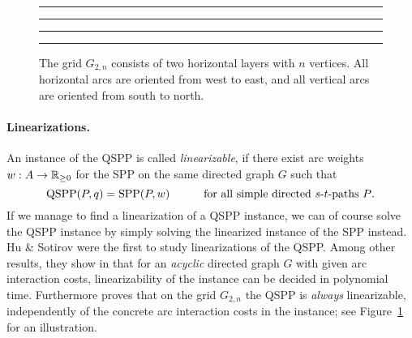 \begin{figure}[b]
\hrule\hrule
\medskip
\bigskip
\begin{center}
\end{center}
\caption{The grid $G_{2,n}$ consists of two horizontal layers with $n$ vertices.
All horizontal arcs are oriented from west to east, and all vertical arcs are oriented from south to north.}
\label{fig:grid}
\bigskip
\hrule\hrule
\end{figure}

\paragraph{Linearizations.}
An instance of the QSPP is called \emph{linearizable}, if there exist arc weights $w:A\to{\mathbb{R}_{\ge0}}$
for the SPP on the same directed graph $G$ such that
\begin{equation}
\label{eq:linearizable}
\text{QSPP}(P,q) = \text{SPP}(P,w) \text{\qquad\quad for all simple directed $s$-$t$-paths $P$.}
\end{equation}
If we manage to find a linearization of a QSPP instance, we can of course solve the QSPP instance
by simply solving the linearized instance of the SPP instead.
Hu \& Sotirov \cite{huSo2018,huSo2021} were the first to study linearizations of the QSPP.
Among other results, they show in \cite{huSo2021} that for an \emph{acyclic} directed graph $G$
with given arc interaction costs, linearizability of the instance can be decided in polynomial time.
Furthermore \cite{huSo2018} proves that on the grid $G_{2,n}$ the QSPP is \emph{always} linearizable,
independently of the concrete arc interaction costs in the instance;
see Figure~\ref{fig:grid} for an illustration.

